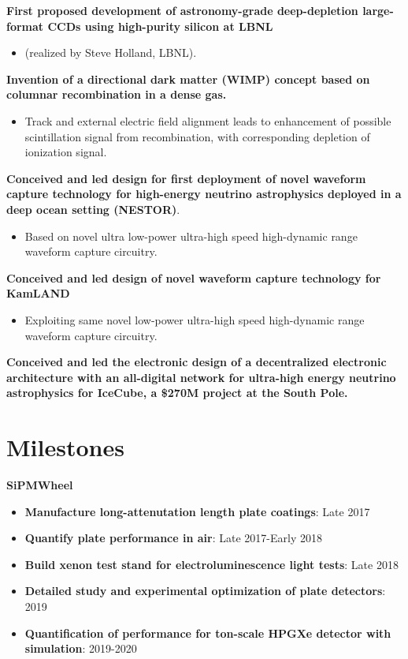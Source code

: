 \noindent\textbf{First proposed development of astronomy-grade deep-depletion large-format CCDs using high-purity silicon at LBNL } 
\begin{itemize}[noitemsep,nolistsep]
\item{(realized by Steve Holland, LBNL).}
\end{itemize}

\noindent\textbf{Invention of a directional dark matter (WIMP) concept based on columnar recombination in a dense gas.} 
\begin{itemize}[noitemsep,nolistsep]
\item{Track and external electric field alignment leads to enhancement of possible scintillation signal from recombination, with corresponding depletion of ionization signal.}
\end{itemize}


\noindent\textbf{Conceived and led design for first deployment of novel waveform capture technology for high-energy neutrino astrophysics deployed in a deep ocean setting (NESTOR)}. 
\begin{itemize}[noitemsep,nolistsep] 
\item{Based on novel ultra low-power ultra-high speed high-dynamic range waveform capture circuitry.}
\end{itemize}

\noindent\textbf{Conceived and led design of novel waveform capture technology for KamLAND}
\begin{itemize}[noitemsep,nolistsep] 
\item{Exploiting same novel low-power ultra-high speed high-dynamic range waveform capture circuitry.}
\end{itemize}

\noindent\textbf{Conceived and led the electronic design of a decentralized electronic architecture with an all-digital network for ultra-high energy neutrino astrophysics for IceCube, a  \$270M project at the South Pole.}

\section*{\textbf{Milestones}}
\noindent\textbf{SiPMWheel}
\begin{itemize}[noitemsep,nolistsep]
\item{\textbf{Manufacture long-attenutation length plate coatings}}: Late 2017
\item{\textbf{Quantify plate performance in air}}: Late 2017-Early 2018
\item{\textbf{Build xenon test stand for electroluminescence light tests}}: Late 2018
\item{\textbf{Detailed study and experimental optimization of plate detectors}}: 2019
\item{\textbf{Quantification of performance for ton-scale HPGXe detector with simulation}}: 2019-2020

\end{itemize}


